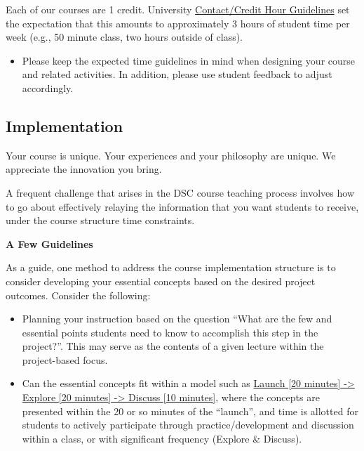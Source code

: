 \documentclass[
]{book}
\providecommand{\tightlist}{%
  \setlength{\itemsep}{0pt}\setlength{\parskip}{0pt}}
\begin{document}
Each of our courses are 1 credit. University \href{https://oucc.dasa.ncsu.edu/courses/contact-credit-hours/}{Contact/Credit Hour Guidelines} set the expectation that this amounts to approximately 3 hours of student time per week (e.g., 50 minute class, two hours outside of class).

\begin{itemize}
\tightlist
\item
  Please keep the expected time guidelines in mind when designing your course and related activities. In addition, please use student feedback to adjust accordingly.
\end{itemize}

\hypertarget{implementation}{%
\subsection{Implementation}\label{implementation}}

Your course is unique. Your experiences and your philosophy are unique. We appreciate the innovation you bring.

A frequent challenge that arises in the DSC course teaching process involves how to go about effectively relaying the information that you want students to receive, under the course structure time constraints.

\textbf{A Few Guidelines}

As a guide, one method to address the course implementation structure is to consider developing your essential concepts based on the desired project outcomes. Consider the following:

\begin{itemize}
\item
  Planning your instruction based on the question ``What are the few and essential points students need to know to accomplish this step in the project?''. This may serve as the contents of a given lecture within the project-based focus.
\item
  Can the essential concepts fit within a model such as \href{https://drive.google.com/file/d/13AwDhsoMFh31YdHoxdP_5FaaqUdqkM1W/view}{Launch {[}20 minutes{]} -\textgreater{} Explore {[}20 minutes{]} -\textgreater{} Discuss {[}10 minutes{]}}, where the concepts are presented within the 20 or so minutes of the ``launch'', and time is allotted for students to actively participate through practice/development and discussion within a class, or with significant frequency (Explore \& Discuss).
\end{itemize}
\end{document}
